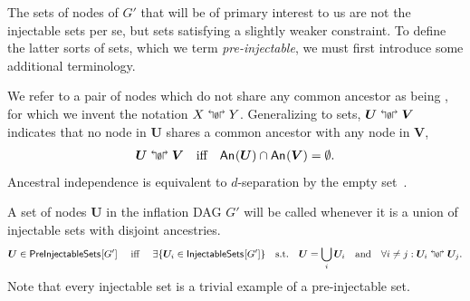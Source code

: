 The sets of nodes of $G'$ that will be of primary interest to us are not the injectable sets per se, but sets satisfying a slightly weaker constraint.
To define the latter sorts of sets, which we term {\em pre-injectable}, we must first introduce some additional terminology. 

We refer to a pair of nodes which do not share any common ancestor as being , for which we invent the notation $X\mathrel{\mathopen{\Lsh}{\scriptstyle\emptyset}\mathclose{\Rsh}} Y$. Generalizing to sets, $\bm{U}\mathrel{\mathopen{\Lsh}{\scriptstyle\emptyset}\mathclose{\Rsh}} \bm{V}$ indicates that no node in $\bm{U}$ shares a common ancestor with any node in $\bm{V}$, 
\begin{align}
\bm{U}\mathrel{\mathopen{\Lsh}{\scriptstyle\emptyset}\mathclose{\Rsh}} \bm{V} \quad \text{iff} \quad {\mathsf{An}_{}}\lparen\bm{U}\rparen\cap{\mathsf{An}_{}}\lparen\bm{V}\rparen=\emptyset.
\end{align}
Ancestral independence is equivalent to $d$-separation by the empty set~\cite{pearl2009causality,spirtes2011causation,studeny2005probabilistic,koller2009probabilistic}. 


A set of nodes $\bm{U}$ in the inflation DAG $G'$ will be called  whenever it is a union of injectable sets with disjoint ancestries. 
\begin{align}\label{eq:defpreinj}
\bm{U}\in{\operatorname{\mathsf{PreInjectableSets}}_{}}\lbrack G'\rbrack \quad\text{ iff }\quad  \exists \{ \bm{U}_i \in {\operatorname{\mathsf{InjectableSets}}_{}}\lbrack G'\rbrack \} \quad \text{s.t.}\quad \bm{U}=\bigcup_i \bm{U}_i  \quad\text{and} \quad  \forall i\ne j: \bm{U}_i \mathrel{\mathopen{\Lsh}{\scriptstyle\emptyset}\mathclose{\Rsh}} \bm{U}_j.
\end{align}
Note that every injectable set is a trivial example of a pre-injectable set.

